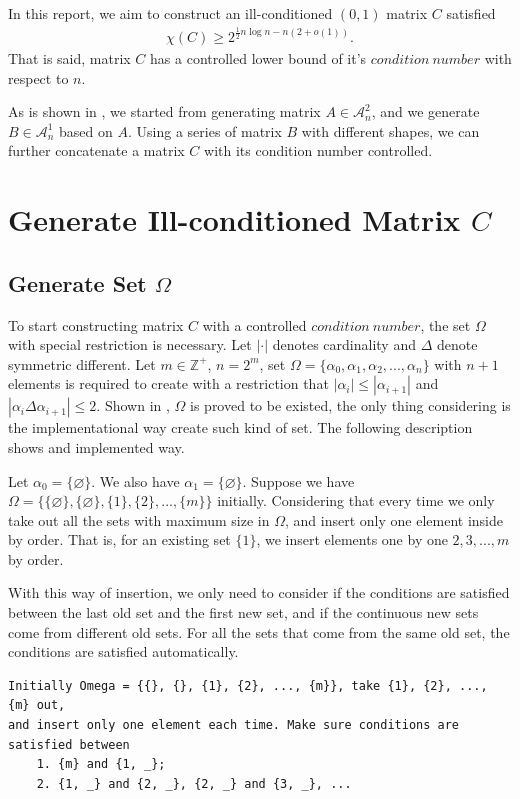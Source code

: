 \documentclass[11pt]{article}
\begin{document}
In this report, we aim to construct an ill-conditioned $(0, 1)$ matrix $C$ satisfied
\begin{align*}
\chi(C) \geq2^{\frac{1}{2}n\log n-n(2+o(1))}.
\end{align*}
That is said, matrix $C$ has a controlled lower bound of it's $condition\ number$ with respect to $n$. 

As is shown in \cite{ALON1997133}, we started from generating matrix $A \in \mathcal{A}_n^2$, and we generate $B \in \mathcal{A}_n^1$ based on $A$. Using a series of matrix $B$ with different shapes, we can further concatenate a matrix $C$ with its condition number controlled.



\section{Generate Ill-conditioned Matrix $C$}


\subsection{Generate Set $\Omega$}
To start constructing matrix $C$ with a controlled $condition\ number$, the set $\Omega$ with special restriction is necessary. Let $|\cdot|$ denotes cardinality and $\Delta$ denote symmetric different. Let $m\in \mathbb{Z}^{+}$, $n=2^m$, set $\Omega = \{\alpha_0, \alpha_1, \alpha_2, ..., \alpha_n\}$ with $n + 1$ elements is required to create with a restriction that $|\alpha_i| \leq |\alpha_{i+1}|$ and $|\alpha_i \Delta \alpha_{i+1}| \leq 2$. Shown in \cite{doi:10.1137/S0895480192235878}, $\Omega$ is proved to be existed, the only thing considering is the implementational way create such kind of set. The following description shows and implemented way.

Let $\alpha_0=\{\varnothing\}$. We also have $\alpha_1=\{\varnothing\}$. Suppose we have $\Omega = \{\{\varnothing\}, \{\varnothing\}, \{1\}, \{2\}, ..., \{m\}\}$ initially. Considering that every time we only take out all the sets with maximum size in $\Omega$, and insert only one element inside by order. That is, for an existing set $\{1\}$, we insert elements one by one $2, 3, ..., m$ by order.

With this way of insertion, we only need to consider if the conditions are satisfied between the last old set and the first new set, and if the continuous new sets come from different old sets. For all the sets that come from the same old set, the conditions are satisfied automatically.
\begin{lstlisting}
Initially Omega = {{}, {}, {1}, {2}, ..., {m}}, take {1}, {2}, ..., {m} out, 
and insert only one element each time. Make sure conditions are satisfied between
    1. {m} and {1, _}; 
    2. {1, _} and {2, _}, {2, _} and {3, _}, ...
\end{lstlisting}
\end{document}
